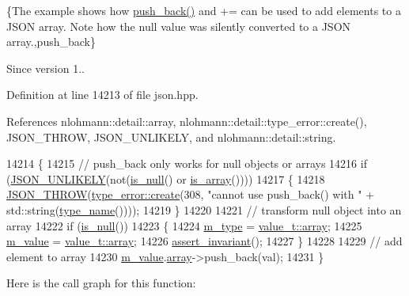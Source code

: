 \{The example shows how {\ttfamily \hyperlink{classnlohmann_1_1basic__json_ac8e523ddc8c2dd7e5d2daf0d49a9c0d7}{push\+\_\+back()}} and {\ttfamily +=} can be used to add elements to a J\+S\+ON array. Note how the {\ttfamily null} value was silently converted to a J\+S\+ON array.,push\+\_\+back\}

\begin{DoxySince}{Since}
version 1.. 
\end{DoxySince}


Definition at line 14213 of file json.\+hpp.



References nlohmann\+::detail\+::array, nlohmann\+::detail\+::type\+\_\+error\+::create(), J\+S\+O\+N\+\_\+\+T\+H\+R\+OW, J\+S\+O\+N\+\_\+\+U\+N\+L\+I\+K\+E\+LY, and nlohmann\+::detail\+::string.


\begin{DoxyCode}
14214     \{
14215         \textcolor{comment}{// push\_back only works for null objects or arrays}
14216         \textcolor{keywordflow}{if} (\hyperlink{json_8hpp_ab77582407c64944e7db1ea95ab520253}{JSON\_UNLIKELY}(not(\hyperlink{classnlohmann_1_1basic__json_a8faa039ca82427ed29c486ffd00600c3}{is\_null}() or \hyperlink{classnlohmann_1_1basic__json_aef9ce5dd2381caee1f8ddcdb5bdd9c65}{is\_array}())))
14217         \{
14218             \hyperlink{json_8hpp_a6c274f6db2e65c1b66c7d41b06ad690f}{JSON\_THROW}(\hyperlink{classnlohmann_1_1detail_1_1type__error_aecc083aea4b698c33d042670ba50c10f}{type\_error::create}(308, \textcolor{stringliteral}{"cannot use push\_back() with "} +
       std::string(\hyperlink{classnlohmann_1_1basic__json_a9d0a478571f82f0163b96b2424cd998f}{type\_name}())));
14219         \}
14220 
14221         \textcolor{comment}{// transform null object into an array}
14222         \textcolor{keywordflow}{if} (\hyperlink{classnlohmann_1_1basic__json_a8faa039ca82427ed29c486ffd00600c3}{is\_null}())
14223         \{
14224             \hyperlink{classnlohmann_1_1basic__json_a91990b60d7d4d67968a2c1db677536e7}{m\_type} = \hyperlink{namespacenlohmann_1_1detail_a1ed8fc6239da25abcaf681d30ace4985af1f713c9e000f5d3f280adbd124df4f5}{value\_t::array};
14225             \hyperlink{classnlohmann_1_1basic__json_aeb0814f76966f99290cb29e127c90a77}{m\_value} = \hyperlink{namespacenlohmann_1_1detail_a1ed8fc6239da25abcaf681d30ace4985af1f713c9e000f5d3f280adbd124df4f5}{value\_t::array};
14226             \hyperlink{classnlohmann_1_1basic__json_a4a82d3fb7a111641decf35c2fb707c7f}{assert\_invariant}();
14227         \}
14228 
14229         \textcolor{comment}{// add element to array}
14230         \hyperlink{classnlohmann_1_1basic__json_aeb0814f76966f99290cb29e127c90a77}{m\_value}.\hyperlink{unionnlohmann_1_1basic__json_1_1json__value_a7947687f3ae1911d6e9847e2b3226157}{array}->push\_back(val);
14231     \}
\end{DoxyCode}
Here is the call graph for this function\+:
\mbox{\label{classnlohmann_1_1basic__json_ae11a3a51782c058fff2f6550cdfb9b3c}} 
